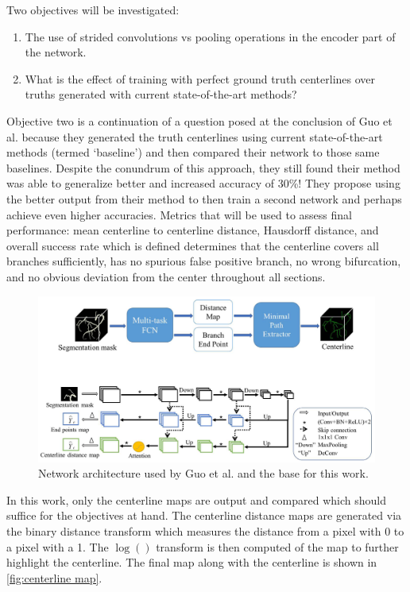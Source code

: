 \documentclass[10pt,twocolumn,letterpaper]{article}
\begin{document}
Two objectives will be investigated:
\begin{enumerate}
    \item The use of strided convolutions vs pooling operations in the encoder part of the network.
    \item What is the effect of training with perfect ground truth centerlines over truths generated with current state-of-the-art methods?
\end{enumerate}

Objective two is a continuation of a question posed at the conclusion of Guo et al. because they generated the truth centerlines using current state-of-the-art methods (termed `baseline') and then compared their network to those same baselines. Despite the conundrum of this approach, they still found their method was able to generalize better and increased accuracy of 30\%! They propose using the better output from their method to then train a second network and perhaps achieve even higher accuracies. Metrics that will be used to assess final performance: mean centerline to centerline distance, Hausdorff distance, and overall success rate which is defined determines that the centerline covers all branches sufficiently, has no spurious false positive branch, no wrong bifurcation, and no obvious deviation from the center throughout all sections.

\begin{figure}[!h]
\begin{center}
   \includegraphics[width=0.95\linewidth]{figures/network-arch-guo.png}
\end{center}
   \caption{Network architecture used by Guo et al. \cite{guoDeepCenterlineMultitaskFully2019} and the base for this work.}
\label{fig:fig1}
\end{figure}

In this work, only the centerline maps are output and compared which should suffice for the objectives at hand. The centerline distance maps are generated via the binary distance transform which measures the distance from a pixel with 0 to a pixel with a 1. The $\log()$ transform is then computed of the map to further highlight the centerline. The final map along with the centerline is shown in \ref{fig:centerline map}.
\end{document}
